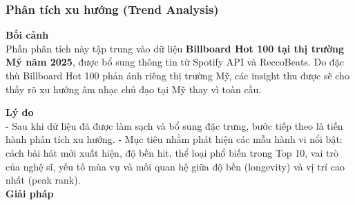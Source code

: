 \subsubsection{Phân tích xu hướng (Trend Analysis)}

\textbf{Bối cảnh} \\

Phần phân tích này tập trung vào dữ liệu \textbf{Billboard Hot 100 tại thị trường Mỹ năm 2025}, được bổ sung thông tin từ Spotify API và ReccoBeats. 
Do đặc thù Billboard Hot 100 phản ánh riêng thị trường Mỹ, các insight thu được sẽ cho thấy rõ xu hướng âm nhạc chủ đạo tại Mỹ thay vì toàn cầu.

\textbf{Lý do} \\

- Sau khi dữ liệu đã được làm sạch và bổ sung đặc trưng, bước tiếp theo là tiến hành phân tích xu hướng. 
- Mục tiêu nhằm phát hiện các mẫu hành vi nổi bật: cách bài hát mới xuất hiện, độ bền hit, thể loại phổ biến trong Top 10, vai trò của nghệ sĩ, yếu tố mùa vụ và mối quan hệ giữa độ bền (longevity) và vị trí cao nhất (peak rank). \\

\textbf{Giải pháp} \\

